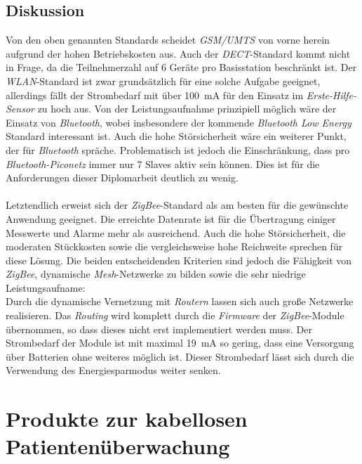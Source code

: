     \subsection{Diskussion}
        Von den oben genannten Standards scheidet \emph{GSM/UMTS} von vorne herein aufgrund der hohen Betriebskosten aus.
        Auch der \emph{DECT}-Standard kommt nicht in Frage, da die Teilnehmerzahl auf 6 Geräte pro Basisstation beschränkt
        ist.  Der \emph{WLAN}-Standard ist zwar grundsätzlich für eine solche Aufgabe geeignet, allerdings fällt der 
        Strombedarf mit über 100~mA für den Einsatz im \emph{Erste-Hilfe-Sensor} zu hoch aus. Von der Leistungsaufnahme 
        prinzipiell möglich wäre der Einsatz von \emph{Bluetooth}, wobei insbesondere der kommende 
        \emph{Bluetooth Low Energy} Standard interessant ist. Auch die
        hohe Störsicherheit wäre ein weiterer Punkt, der für \emph{Bluetooth} spräche. Problematisch ist jedoch die 
        Einschränkung, dass pro \emph{Bluetooth-Piconetz} immer nur 7 Slaves aktiv sein können. Dies ist für die 
        Anforderungen dieser Diplomarbeit deutlich zu wenig.\\
        \\
        Letztendlich erweist sich der \emph{ZigBee}-Standard als am besten für die gewünschte Anwendung geeignet. 
        Die erreichte Datenrate ist für die Übertragung einiger Messwerte und Alarme mehr als ausreichend. Auch die 
        hohe Störsicherheit, die moderaten Stückkosten sowie die vergleichsweise hohe Reichweite sprechen für diese Lösung. 
        Die beiden entscheidenden Kriterien sind jedoch die Fähigkeit von \emph{ZigBee}, dynamische \emph{Mesh}-Netzwerke 
        zu bilden sowie die sehr niedrige Leistungsaufname:\\
        Durch die dynamische Vernetzung mit \emph{Routern} lassen sich auch große Netzwerke realisieren. Das 
        \emph{Routing} wird komplett durch die \emph{Firmware} der \emph{ZigBee}-Module übernommen, so dass dieses 
        nicht erst implementiert werden muss. Der Strombedarf
        der Module ist mit maximal 19~mA so gering, dass eine Versorgung über Batterien ohne weiteres möglich ist.
        Dieser Strombedarf lässt sich durch die Verwendung des Energiesparmodus weiter senken.

\section{Produkte zur kabellosen Patientenüberwachung}\label{produkte_zur_patientenueberwachung}

